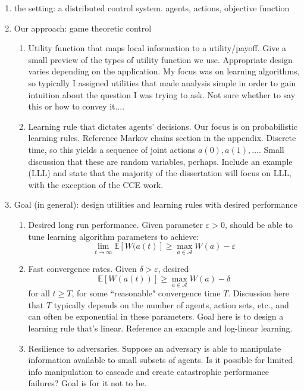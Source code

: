 \begin{enumerate}
    \item the setting: a distributed control system. agents, actions, objective function
    \item Our approach: game theoretic control
    \begin{enumerate}
        \item Utility function that maps local information to a utility/payoff. Give a small preview of the types of utility function we use. Appropriate design varies depending on the application. My focus was on learning algorithms, so typically I assigned utilities that made analysis simple in order to gain intuition about the question I was trying to ask. Not sure whether to say this or how to convey it....
        \item Learning rule that dictates agents' decisions. Our focus is on probabilistic learning rules. Reference Markov chains section in the appendix. Discrete time, so this yields a sequence of joint actions $a(0),a(1),\ldots.$ Small discussion that these are random variables, perhaps. Include an example (LLL) and state that the majority of the dissertation will focus on LLL, with the exception of the CCE work.
    \end{enumerate}
    \item Goal (in general): design utilities and learning rules with desired performance
    \begin{enumerate}
        \item Desired long run performance. Given parameter $\varepsilon>0$, should be able to tune learning algorithm parameters to achieve:
        $$\lim_{t\to\infty}\mathbb{E}[ W(a(t)]\geq \max_{a\in\mathcal{A}}W(a) - \varepsilon$$
        \item Fast convergence rates. Given $\delta > \varepsilon$, desired
        $$\mathbb{E}[W(a(t))]\geq \max_{a\in\mathcal{A}}W(a) - \delta$$
        for all $t\geq T$, for some ``reasonable" convergence time $T$. Discussion here that $T$ typically depends on the number of agents, action sets, etc., and can often be exponential in these parameters. Goal here is to design a learning rule that's linear. Reference an example and log-linear learning.
        \item Resilience to adversaries. Suppose an adversary is able to manipulate information available to small subsets of agents. Is it possible for limited info manipulation to cascade and create catastrophic performance failures? Goal is for it not to be.
    \end{enumerate}
\end{enumerate}


